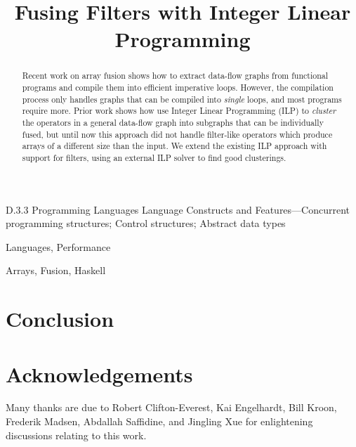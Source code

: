 \documentclass[preprint]{sigplanconf}
\begin{document}
\title{Fusing Filters with Integer Linear Programming}


\maketitle
\makeatactive

\begin{abstract}
Recent work on array fusion shows how to extract data-flow graphs from functional programs and compile them into efficient imperative loops. However, the compilation process only handles graphs that can be compiled into \emph{single} loops, and most programs require more. Prior work shows how use Integer Linear Programming (ILP) to \emph{cluster} the operators in a general data-flow graph into subgraphs that can be individually fused, but until now this approach did not handle filter-like operators which produce arrays of a different size than the input. We extend the existing ILP approach with support for filters, using an external ILP solver to find good clusterings.
\end{abstract}


\category
	{D.3.3}
	{Programming Languages}
	{Language Constructs and Features---Concurrent programming structures; Control structures; Abstract data types}

\terms
	Languages, Performance

\keywords
	Arrays, Fusion, Haskell







\section{Conclusion}

\section*{Acknowledgements}
Many thanks are due to
Robert Clifton-Everest,
Kai Engelhardt,
Bill Kroon,
Frederik Madsen,
Abdallah Saffidine,
and Jingling Xue
for enlightening discussions relating to this work.



\end{document}
